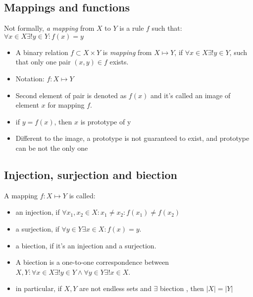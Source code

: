 \subsection{Mappings and functions}

Not formally, \textit{a mapping} from $X$ to $Y$ is a rule $f$ such that: $\forall x \in X \exists ! y \in Y: f(x) = y$

\begin{definition}[]
	\begin{itemize}
		\item A binary relation $f \subset X \times Y$ is \textit{mapping} from $X \mapsto Y$, if $\forall x \in X \exists ! y \in Y$, such that only one pair $(x, y) \in f$ exists.
		\item Notation: $f: X \mapsto Y$
		\item Second element of pair is denoted as $f(x)$ and it's called an image of element $x$ for mapping $f$.
		\item if $y = f(x)$, then $x$ is prototype of y 
		\item Different to the image, a prototype is not guaranteed to exist, and prototype can be not the only one 
	\end{itemize}
\end{definition}

\subsection{Injection, surjection and biection}

\begin{definition}[]
	A mapping $f: X \mapsto Y$ is called:
	\begin{itemize}
		\item an injection, if $\forall x_1, x_2 \in X: x_1 \neq x_2: f(x_1) \neq f(x_2)$
		\item a surjection, if $\forall y \in Y \exists x \in X: f(x) = y$.
		\item a biection, if it's an injection and a surjection. 
	\end{itemize} 
\end{definition}

\begin{note}[]
	\begin{itemize}
		\item A biection is a one-to-one correspondence between $X, Y : \forall x \in X \exists ! y \in Y \wedge \forall y \in Y \exists ! x \in X$.
		\item in particular, if $X, Y$ are not endless sets and $\exists $ biection , then $|X| = |Y|$ 
	\end{itemize}
\end{note}

